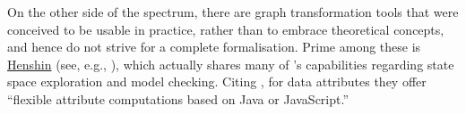 \medskip\noindent On the other side of the spectrum, there are graph transformation tools that were conceived to be usable in practice, rather than to embrace theoretical concepts, and hence do not strive for a complete formalisation. Prime among these is \href{https://github.com/eclipse-henshin}{Henshin} (see, e.g., \cite{Henshin,Henshin-usability}), which actually shares many of \GROOVE's capabilities regarding state space exploration and model checking. Citing \cite{Henshin}, for data attributes they offer ``flexible attribute computations based on Java or JavaScript.''
